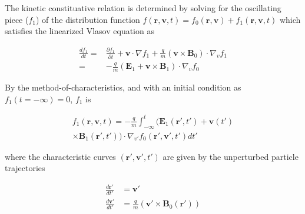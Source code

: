 \documentclass[final,5p,times,twocolumn]{elsarticle}
\newcounter{bla}
\renewcommand{\vec}[1]{\mathbf{#1}}
\begin{document}
The kinetic constituative relation is determined by solving for the oscillating piece ($f_{\mathrm{1}}$) of the distribution function $f\left(\vec{r},\vec{v},t\right)=f_{\mathrm{0}}\left(\vec{r},\vec{v}\right)+f_{\mathrm{1}}\left(\vec{r},\vec{v},t\right)$ which satisfies the linearized Vlasov equation as 
%
\begin{linenomath}
\begin{equation}
\begin{split}
\label{eq:lin_vlasov}
\frac{df_1}{dt}=&\frac{\partial f_1}{\partial t}+\vec{v}\cdot\nabla f_{\mathrm{1}}+\frac{q}{m}\left(\vec{v}\times\vec{B}_{\mathrm{0}}\right)\cdot\nabla_v f_1\\=&-\frac{q}{m}\left(\vec{E}_1+\vec{v}\times\vec{B}_1\right)\cdot\nabla_v f_0
\end{split}
\end{equation}
\end{linenomath}
%
By the method-of-characteristics, and with an initial condition as $f_{\mathrm{1}}\left(t=-\mathrm{\infty}\right)=0$, $f_{\mathrm{1}}$ is 
%
\begin{linenomath}
\begin{equation}
\begin{split}
\label{eq:f1}
f_{\mathrm{1}}\left(\vec{r},\vec{v},t\right)=-\frac{q}{m}\int_{-\mathrm{\infty}}^{t}
\Big(\vec{E}_{\mathrm{1}}\left(\vec{r}',t'\right)+\vec{v}\left(t'\right)\\ \times\vec{B}_1\left(\vec{r}',t'\right) 
\hspace{0cm}\Big) \cdot\nabla_{v'} f_{\mathrm{0}} \left(\vec{r}',\vec{v}',t'\right)dt'
\end{split}
\end{equation}
\end{linenomath}
%
where the characteristic curves $\left(\vec{r}',\vec{v}',t'\right)$ are given by the unperturbed particle trajectories
%
\begin{linenomath}
\begin{equation}
\begin{split}
\label{eq:trajectories}
\frac{d\vec{r}'}{dt'}&=\vec{v}'\\
\frac{d\vec{v}'}{dt'}&=\frac{q}{m}\left(\vec{v}'\times\vec{B}_{\mathrm{0}}\left(\vec{r}'\right)\right)
\end{split}
\end{equation}
\end{linenomath}
\end{document}
